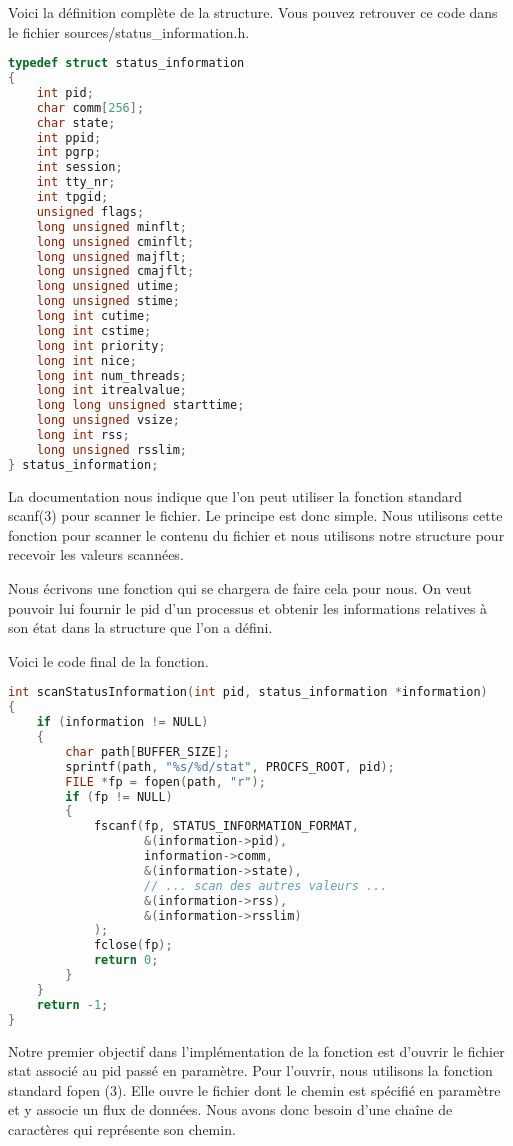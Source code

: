 \pagebreak
Voici la définition complète de la structure. Vous pouvez retrouver ce code dans le fichier sources/status\_information.h.

\begin{lstlisting}[frame=single, language=c]
typedef struct status_information
{
    int pid;
    char comm[256];
    char state;
    int ppid;
    int pgrp;
    int session;
    int tty_nr;
    int tpgid;
    unsigned flags;
    long unsigned minflt;
    long unsigned cminflt;
    long unsigned majflt;
    long unsigned cmajflt;
    long unsigned utime;
    long unsigned stime;
    long int cutime;
    long int cstime;
    long int priority;
    long int nice;
    long int num_threads;
    long int itrealvalue;
    long long unsigned starttime;
    long unsigned vsize;
    long int rss;
    long unsigned rsslim;
} status_information;
\end{lstlisting}

La documentation nous indique que l’on peut utiliser la fonction standard scanf(3) pour scanner le fichier. Le principe est donc simple. Nous utilisons cette fonction pour scanner le contenu du fichier et nous utilisons notre structure pour recevoir les valeurs scannées. 

Nous écrivons une fonction qui se chargera de faire cela pour nous. On veut pouvoir lui fournir le pid d’un processus et obtenir les informations relatives à son état dans la structure que l'on a défini. 

Voici le code final de la fonction. 
\begin{lstlisting}[frame=single, language=c]
int scanStatusInformation(int pid, status_information *information)
{
    if (information != NULL)
    {
        char path[BUFFER_SIZE];
        sprintf(path, "%s/%d/stat", PROCFS_ROOT, pid);
        FILE *fp = fopen(path, "r");
        if (fp != NULL)
        {
            fscanf(fp, STATUS_INFORMATION_FORMAT,
                   &(information->pid),
                   information->comm,
                   &(information->state),
                   // ... scan des autres valeurs ...
                   &(information->rss),
                   &(information->rsslim)
            );
            fclose(fp);
            return 0;
        }
    }
    return -1;
}
\end{lstlisting}

Notre premier objectif dans l'implémentation de la fonction est d'ouvrir le fichier stat associé au pid passé en paramètre. Pour l'ouvrir, nous utilisons la fonction standard fopen (3). Elle ouvre le fichier dont le chemin est spécifié en paramètre et y associe un flux de données. Nous avons donc besoin d'une chaîne de caractères qui représente son chemin.

